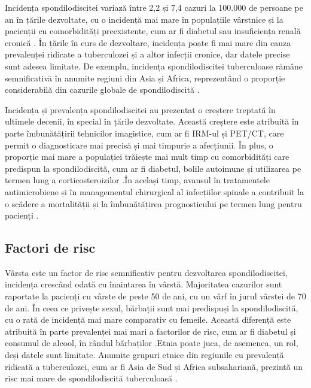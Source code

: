 \documentclass[romanian,12pt,a4paper]{article}
\begin{document}
Incidența spondilodiscitei variază între 2,2 și 7,4 cazuri la 100.000 de
persoane pe an în țările dezvoltate, cu o incidență mai mare în
populațiile vârstnice și la pacienții cu comorbidități preexistente, cum
ar fi diabetul sau insuficiența renală cronică
\cite{ImagingAssessmentSpine2024}. În țările în curs de dezvoltare,
incidența poate fi mai mare din cauza prevalenței ridicate a
tuberculozei și a altor infecții cronice, dar datele precise sunt adesea
limitate. De exemplu, incidența spondilodiscitei tuberculoase rămâne
semnificativă în anumite regiuni din Asia și Africa, reprezentând o
proporție considerabilă din cazurile globale de spondilodiscită
\cite{RadionuclideImagingMusculoskeletal2016}.

Incidența și prevalența spondilodiscitei au prezentat o creștere
treptată în ultimele decenii, în special în țările dezvoltate. Această
creștere este atribuită în parte îmbunătățirii tehnicilor imagistice,
cum ar fi IRM-ul și PET/CT, care permit o diagnosticare mai precisă și
mai timpurie a afecțiunii. În plus, o proporție mai mare a populației
trăiește mai mult timp cu comorbidități care predispun la
spondilodiscită, cum ar fi diabetul, bolile autoimune și utilizarea pe
termen lung a corticosteroizilor
\cite{RoleNuclearMedicine2012}\cite{ImagingAssessmentSpine2024}.În
același timp, avansul în tratamentele antimicrobiene și în managementul
chirurgical al infecțiilor spinale a contribuit la o scădere a
mortalității și la îmbunătățirea prognosticului pe termen lung pentru
pacienți \cite{RadionuclideImagingMusculoskeletal2016}.

\subsection{Factori de risc}

Vârsta este un factor de risc semnificativ pentru dezvoltarea
spondilodiscitei, incidența crescând odată cu înaintarea în vârstă.
Majoritatea cazurilor sunt raportate la pacienți cu vârste de peste 50
de ani, cu un vârf în jurul vârstei de 70 de ani. În ceea ce privește
sexul, bărbații sunt mai predispuși la spondilodiscită, cu o rată de
incidență mai mare comparativ cu femeile. Această diferență este
atribuită în parte prevalenței mai mari a factorilor de risc, cum ar fi
diabetul și consumul de alcool, în rândul bărbaților
\cite{RoleNuclearMedicine2012}.Etnia poate juca, de asemenea, un rol,
deși datele sunt limitate. Anumite grupuri etnice din regiunile cu
prevalență ridicată a tuberculozei, cum ar fi Asia de Sud și Africa
subsahariană, prezintă un risc mai mare de spondilodiscită tuberculoasă
\cite{ImagingAssessmentSpine2024}.
\end{document}
